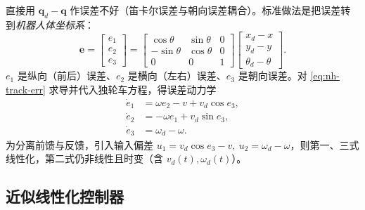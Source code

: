 直接用 $\mathbf{q}_d-\mathbf{q}$ 作误差不好（笛卡尔误差与朝向误差耦合）。标准做法是把误差转到\emph{机器人体坐标系}：
\begin{equation}
  \mathbf{e}=\begin{bmatrix}e_1\\e_2\\e_3\end{bmatrix}
  =\begin{bmatrix}\cos\theta&\sin\theta&0\\-\sin\theta&\cos\theta&0\\0&0&1\end{bmatrix}
  \begin{bmatrix}x_d-x\\y_d-y\\\theta_d-\theta\end{bmatrix}.
  \label{eq:nh-track-err}
\end{equation}
$e_1$ 是纵向（前后）误差、$e_2$ 是横向（左右）误差、$e_3$ 是朝向误差。对 \cref{eq:nh-track-err} 求导并代入独轮车方程，得误差动力学
\begin{equation}
  \begin{aligned}
    \dot e_1&=\omega e_2-v+v_d\cos e_3,\\
    \dot e_2&=-\omega e_1+v_d\sin e_3,\\
    \dot e_3&=\omega_d-\omega .
  \end{aligned}
  \label{eq:nh-track-dyn}
\end{equation}
为分离前馈与反馈，引入输入偏差 $u_1=v_d\cos e_3-v,\ u_2=\omega_d-\omega$，则第一、三式线性化，第二式仍非线性且时变（含 $v_d(t),\omega_d(t)$）。

\subsection{近似线性化控制器}
\label{sec:nh-track-lin}

